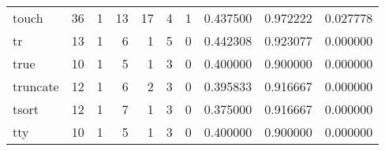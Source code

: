 \begin{tabular}{lrrrrrrrrr}
touch     &                                       36 &                                                  1 &                                                 13 &                                                 17 &                                                  4 &                                                  1 &                                           0.437500 &                               0.972222 &                             0.027778 \\
tr        &                                       13 &                                                  1 &                                                  6 &                                                  1 &                                                  5 &                                                  0 &                                           0.442308 &                               0.923077 &                             0.000000 \\
true      &                                       10 &                                                  1 &                                                  5 &                                                  1 &                                                  3 &                                                  0 &                                           0.400000 &                               0.900000 &                             0.000000 \\
truncate  &                                       12 &                                                  1 &                                                  6 &                                                  2 &                                                  3 &                                                  0 &                                           0.395833 &                               0.916667 &                             0.000000 \\
tsort     &                                       12 &                                                  1 &                                                  7 &                                                  1 &                                                  3 &                                                  0 &                                           0.375000 &                               0.916667 &                             0.000000 \\
tty       &                                       10 &                                                  1 &                                                  5 &                                                  1 &                                                  3 &                                                  0 &                                           0.400000 &                               0.900000 &                             0.000000 \\

\end{tabular}
